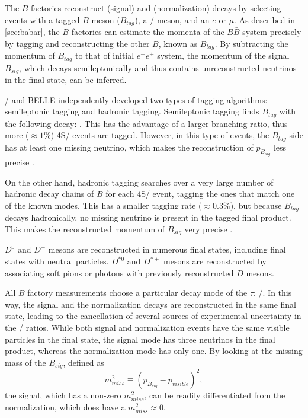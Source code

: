 The $B$ factories reconstruct \BDDstMode{\tau} (signal) and \BDDstMode{\ell}
(normalization) decays by selecting events with a tagged $B$ meson ($B_{tag}$),
a \DDst/ meson, and an $e$ or $\mu$.
As described in \autoref{sec:babar}, the $B$ factories can estimate the momenta
of the $B \bar{B}$ system precisely by tagging and reconstructing the other
$B$, known as $B_{tag}$.
By subtracting the momentum of $B_{tag}$ to that of initial $e^-e^+$ system, the
momentum of the signal $B_{sig}$, which decays semileptonically and thus
contains unreconstructed neutrinos in the final state, can be inferred.

\BaBar/ and BELLE independently developed two types of tagging algorithms:
semileptonic tagging and hadronic tagging.
Semileptonic tagging finds $B_{tag}$ with the following decay: \BDDstMode{\ell}.
This has the advantage of a larger branching ratio, thus more ($\approx 1\%$)
\Y4S/ events are tagged.
However, in this type of events, the $B_{tag}$ side has at least one missing
neutrino, which makes the reconstruction of $p_{B_{sig}}$ less
precise \cite{Ciezarek:2017yzh}.

On the other hand, hadronic tagging searches over a very large number of
hadronic decay chains of $B$ for each \Y4S/ event, tagging the ones that match
one of the known modes.
This has a smaller tagging rate ($\approx 0.3\%$), but because $B_{tag}$ decays
hadronically, no missing neutrino is present in the tagged final product.
This makes the reconstructed momentum of $B_{sig}$ very
precise \cite{Lees:2013uzd,Ciezarek:2017yzh}.

$D^{0}$ and $D^{+}$ mesons are reconstructed in numerous final states, including
final states with neutral particles.
$D^{*0}$ and $D^{*+}$ mesons are reconstructed by associating soft pions or
photons with previously reconstructed $D$ mesons.

All $B$ factory measurements choose a particular decay mode of the $\tau$:
\TauLepMode/.
In this way, the signal and the normalization \BDDstMode{\ell} decays are
reconstructed in the same final state, leading to the cancellation of several
sources of experimental uncertainty in the \RDDst/ ratios.
While both signal and normalization events have the same visible particles in
the final state, the signal mode has three neutrinos in the final product,
whereas the normalization mode has only one.
By looking at the missing mass of the $B_{sig}$, defined as
\begin{equation}
    m^2_{miss} \equiv \left(p_{B_{sig}} - p_{visible}\right)^2,
\end{equation}
the signal, which has a non-zero $m^2_{miss}$, can be readily differentiated
from the normalization, which does have a $m^2_{miss} \approx 0$.

